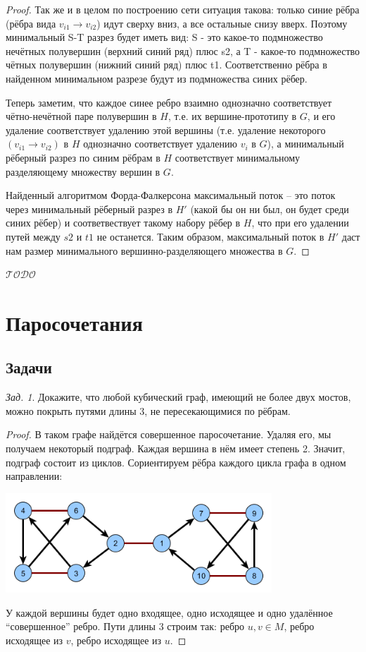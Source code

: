 \documentclass[a4paper,12pt]{article}
\theoremstyle{remark}
\newtheorem{problem}{Зад.}[section]
\def\iiTODO{\guillemotleft$\mathcal{TODO}$\guillemotright\textellipsis}
\begin{document}
\begin{proof}
	Так же и в целом по построению сети ситуация такова: только синие рёбра (рёбра вида $v_{i1} \rightarrow v_{i2}$) идут сверху вниз, а все остальные снизу вверх. Поэтому минимальный S-T разрез будет иметь вид: S - это какое-то подмножество нечётных полувершин (верхний синий ряд) плюс s2, а T - какое-то подмножество чётных полувершин (нижний синий ряд) плюс t1. Соответственно рёбра в найденном минимальном разрезе будут из подмножества синих рёбер.
	
	Теперь заметим, что каждое синее ребро взаимно однозначно соответствует чётно-нечётной паре полувершин в $H$, т.е. их вершине-прототипу в $G$, и его удаление соответствует удалению этой вершины (т.е. удаление некоторого $(v_{i1} \rightarrow v_{i2})$ в $H$ однозначно соответствует удалению $v_i$ в $G$), а минимальный рёберный разрез по синим рёбрам в $H$ соответствует минимальному разделяющему множеству вершин в $G$.
	
	Найденный алгоритмом Форда-Фалкерсона максимальный поток -- это поток через минимальный рёберный разрез в $H'$ (какой бы он ни был, он будет среди синих рёбер) и соответвествует такому набору рёбер в $H$, что при его удалении путей между $s2$ и $t1$ не останется. Таким образом, максимальный поток в $H'$ даст нам размер минимального вершинно-разделяющего множества в $G$.
\end{proof}

\iiTODO



\section{Паросочетания}

\subsection{Задачи}

\begin{problem}
	Докажите, что любой кубический граф, имеющий не более двух мостов, можно покрыть путями длины 3, не пересекающимися по рёбрам.
\end{problem}
\begin{proof}
	В таком графе найдётся совершенное паросочетание. Удаляя его, мы получаем некоторый подграф. Каждая вершина в нём имеет степень 2. Значит, подграф состоит из циклов. Сориентируем рёбра каждого цикла графа в одном направлении:
	\begin{center}
		\includegraphics[width=10cm]{cubic-graph-cover-paths-3.png}
	\end{center}
	У каждой вершины будет одно входящее, одно исходящее и одно удалённое ``совершенное'' ребро. Пути длины 3 строим так: ребро ${u,v} \in M$, ребро исходящее из $v$, ребро исходящее из $u$.
\end{proof}
\end{document}
